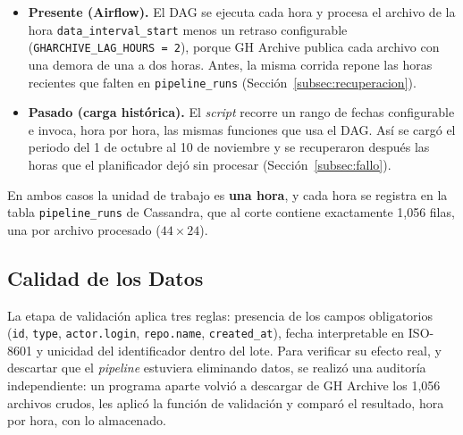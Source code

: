 \begin{itemize}[leftmargin=*]
    \item \textbf{Presente (Airflow).} El DAG se ejecuta cada hora y procesa el archivo de la hora \texttt{data\_interval\_start} menos un retraso configurable (\texttt{GHARCHIVE\_LAG\_HOURS = 2}), porque GH Archive publica cada archivo con una demora de una a dos horas. Antes, la misma corrida repone las horas recientes que falten en \texttt{pipeline\_runs} (Sección~\ref{subsec:recuperacion}).
    \item \textbf{Pasado (carga histórica).} El \textit{script}  recorre un rango de fechas configurable e invoca, hora por hora, las mismas funciones que usa el DAG. Así se cargó el periodo del 1 de octubre al 10 de noviembre y se recuperaron después las horas que el planificador dejó sin procesar (Sección~\ref{subsec:fallo}).
\end{itemize}

En ambos casos la unidad de trabajo es \textbf{una hora}, y cada hora se registra en la tabla \texttt{pipeline\_runs} de Cassandra, que al corte contiene exactamente 1,056 filas, una por archivo procesado ($44 \times 24$).

\subsection{Calidad de los Datos}
\label{subsec:calidad}

La etapa de validación aplica tres reglas: presencia de los campos obligatorios (\texttt{id}, \texttt{type}, \texttt{actor.login}, \texttt{repo.name}, \texttt{created\_at}), fecha interpretable en ISO-8601 y unicidad del identificador dentro del lote. Para verificar su efecto real, y descartar que el \textit{pipeline} estuviera eliminando datos, se realizó una auditoría independiente: un programa aparte volvió a descargar de GH Archive los 1,056 archivos crudos, les aplicó la función de validación y comparó el resultado, hora por hora, con lo almacenado.

